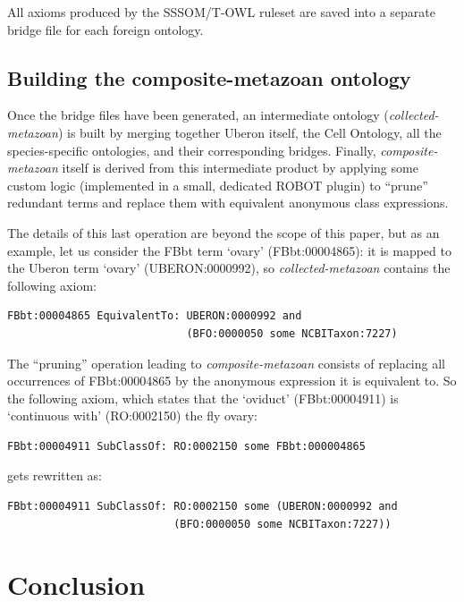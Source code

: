 \documentclass{ceurart}
\def\term#1{`#1'}
\def\curie#1{\textsf{#1}}
\begin{document}
All axioms produced by the SSSOM/T-OWL ruleset are saved into a separate
bridge file for each foreign ontology.

\subsection{Building the composite-metazoan ontology}

Once the bridge files have been generated, an intermediate ontology
(\emph{collected-metazoan}) is built by merging together Uberon itself,
the Cell Ontology, all the species-specific ontologies, and their
corresponding bridges. Finally, \emph{composite-metazoan} itself is
derived from this intermediate product by applying some custom logic
(implemented in a small, dedicated ROBOT plugin) to ``prune'' redundant
terms and replace them with equivalent anonymous class expressions.

The details of this last operation are beyond the scope of this paper,
but as an example, let us consider the FBbt term \term{ovary}
(\curie{FBbt:00004865}): it is mapped to the Uberon term \term{ovary}
(\curie{UBERON:0000992}), so \emph{collected-metazoan} contains the
following axiom:

\begin{lstlisting}
FBbt:00004865 EquivalentTo: UBERON:0000992 and
                            (BFO:0000050 some NCBITaxon:7227)
\end{lstlisting}

The ``pruning'' operation leading to \emph{composite-metazoan} consists
of replacing all occurrences of \curie{FBbt:00004865} by the anonymous
expression it is equivalent to. So the following axiom, which states
that the \term{oviduct} (\curie{FBbt:00004911}) is \term{continuous
with} (\curie{RO:0002150}) the fly ovary:

\begin{lstlisting}
FBbt:00004911 SubClassOf: RO:0002150 some FBbt:000004865
\end{lstlisting}

gets rewritten as:

\begin{lstlisting}
FBbt:00004911 SubClassOf: RO:0002150 some (UBERON:0000992 and
                          (BFO:0000050 some NCBITaxon:7227))
\end{lstlisting}

\section{Conclusion}
\end{document}
